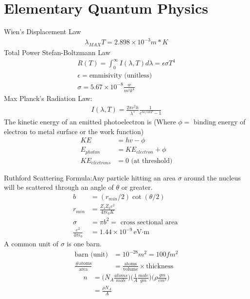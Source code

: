 \chapter{Elementary Quantum Physics}
\thispagestyle{fancy}
\begin{multicols}{2}
Wien's Displacement Law
\begin{align}
\lambda_{MAX}T=2.898 \times 10^{-3}m*K
\end{align}
Total Power Stefan-Boltzmann Law
\begin{align}
R(T)= \int_{0}^{\infty}I(\lambda,T)d\lambda = \epsilon \sigma T^4 \\
\epsilon = \textrm{emmisivity (unitless)} \\
\sigma = 5.67 \times 10^{-8}\frac{w}{m^2k^4}
\end{align}
Max Planck's Radiation Law:
\begin{align}
I(\lambda,T)=\frac{2\pi c^2h}{\lambda^5}\frac{1}{e^{hc/\lambda kT}-1}
\end{align}
The kinetic energy of an emitted photoelectron is (Where $\phi =$ binding energy of electron to metal surface or the work function)
\begin{align}
KE &= hv- \phi \\
E_{photon} &= KE_{electron} + \phi \\
KE_{electrons} &=0 \textrm{ (at threshold)}
\end{align}

Ruthford Scattering Formula:Any particle hitting an area $\sigma$ around the nucleus will be scattered through an angle of $\theta$ or greater.
\begin{align}
b &= (r_{min}/2) \cot (\theta /2) \\
r_{min} &= \frac{Z_1Z_2e^2}{4 \pi \epsilon_0 K} \\
\sigma &= \pi b^2 = \textrm{ cross sectional area } \\
\frac{e^2}{4\pi\epsilon_0} &= 1.44 \times 10^{-9} \textrm{eV$\cdot$m}
\end{align}
A common unit of $\sigma$ is one barn.
\begin{align}
\textrm{barn (unit)} &= 10^{-28} m^2 = 100 fm^2 \\
\frac{ \textrm{\# atoms} }{ \textrm{area} } &= \frac{ \textrm{atoms} }{ \textrm{volume} } \times \textrm{thickness}
\end{align}
\begin{align}
n &= \bigg(N_A\frac{atoms}{mole}\bigg)\bigg(\frac{1}{A}\frac{mole}{gm}\bigg)\bigg(\rho \frac{gm}{cm^3}\bigg) \\ &= \frac{\rho N_A}{A}
\end{align}


\end{multicols}

